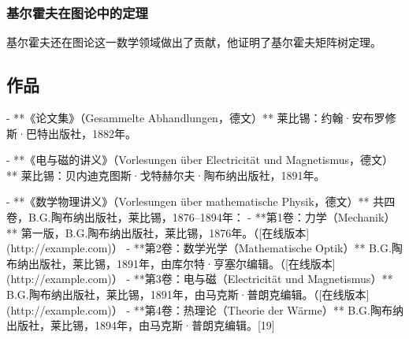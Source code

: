 \subsubsection{基尔霍夫在图论中的定理} 
基尔霍夫还在图论这一数学领域做出了贡献，他证明了基尔霍夫矩阵树定理。
\subsection{作品} 
- **《论文集》（Gesammelte Abhandlungen，德文）**  
  莱比锡：约翰·安布罗修斯·巴特出版社，1882年。  

- **《电与磁的讲义》（Vorlesungen über Electricität und Magnetismus，德文）**  
  莱比锡：贝内迪克图斯·戈特赫尔夫·陶布纳出版社，1891年。  

- **《数学物理讲义》（Vorlesungen über mathematische Physik，德文）**  
  共四卷，B.G.陶布纳出版社，莱比锡，1876–1894年：  
  - **第1卷：力学（Mechanik）**  
    第一版，B.G.陶布纳出版社，莱比锡，1876年。（[在线版本](http://example.com)）  
  - **第2卷：数学光学（Mathematische Optik）**  
    B.G.陶布纳出版社，莱比锡，1891年，由库尔特·亨塞尔编辑。（[在线版本](http://example.com)）  
  - **第3卷：电与磁（Electricität und Magnetismus）**  
    B.G.陶布纳出版社，莱比锡，1891年，由马克斯·普朗克编辑。（[在线版本](http://example.com)）  
  - **第4卷：热理论（Theorie der Wärme）**  
    B.G.陶布纳出版社，莱比锡，1894年，由马克斯·普朗克编辑。[19]